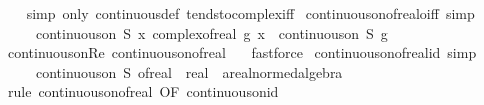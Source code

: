 \begin{isabellebody}
%
\isadelimproof
\ \ %
\endisadelimproof
%
\isatagproof
{}\isamarkupfalse%
\ {\isacharparenleft}{\kern0pt}simp\ only{\isacharcolon}{\kern0pt}\ continuous{\isacharunderscore}{\kern0pt}def\ tendsto{\isacharunderscore}{\kern0pt}complex{\isacharunderscore}{\kern0pt}iff{\isacharparenright}{\kern0pt}%
\endisatagproof
{\isafoldproof}%
%
\isadelimproof
\isanewline
%
\endisadelimproof
\isanewline
{}\isamarkupfalse%
\ continuous{\isacharunderscore}{\kern0pt}on{\isacharunderscore}{\kern0pt}of{\isacharunderscore}{\kern0pt}real{\isacharunderscore}{\kern0pt}o{\isacharunderscore}{\kern0pt}iff\ {\isacharbrackleft}{\kern0pt}simp{\isacharbrackright}{\kern0pt}{\isacharcolon}{\kern0pt}\isanewline
\ \ \ \ \ {\isachardoublequoteopen}continuous{\isacharunderscore}{\kern0pt}on\ S\ {\isacharparenleft}{\kern0pt}{\isasymlambda}x{\isachardot}{\kern0pt}\ complex{\isacharunderscore}{\kern0pt}of{\isacharunderscore}{\kern0pt}real\ {\isacharparenleft}{\kern0pt}g\ x{\isacharparenright}{\kern0pt}{\isacharparenright}{\kern0pt}\ {\isacharequal}{\kern0pt}\ continuous{\isacharunderscore}{\kern0pt}on\ S\ g{\isachardoublequoteclose}\isanewline
%
\isadelimproof
\ \ %
\endisadelimproof
%
\isatagproof
{}\isamarkupfalse%
\ continuous{\isacharunderscore}{\kern0pt}on{\isacharunderscore}{\kern0pt}Re\ continuous{\isacharunderscore}{\kern0pt}on{\isacharunderscore}{\kern0pt}of{\isacharunderscore}{\kern0pt}real\ \ \isamarkupfalse%
\ fastforce%
\endisatagproof
{\isafoldproof}%
%
\isadelimproof
\isanewline
%
\endisadelimproof
\isanewline
{}\isamarkupfalse%
\ continuous{\isacharunderscore}{\kern0pt}on{\isacharunderscore}{\kern0pt}of{\isacharunderscore}{\kern0pt}real{\isacharunderscore}{\kern0pt}id\ {\isacharbrackleft}{\kern0pt}simp{\isacharbrackright}{\kern0pt}{\isacharcolon}{\kern0pt}\isanewline
\ \ \ \ \ {\isachardoublequoteopen}continuous{\isacharunderscore}{\kern0pt}on\ S\ {\isacharparenleft}{\kern0pt}of{\isacharunderscore}{\kern0pt}real\ {\isacharcolon}{\kern0pt}{\isacharcolon}{\kern0pt}\ real\ {\isasymRightarrow}\ {\isacharprime}{\kern0pt}a{\isacharcolon}{\kern0pt}{\isacharcolon}{\kern0pt}real{\isacharunderscore}{\kern0pt}normed{\isacharunderscore}{\kern0pt}algebra{\isacharunderscore}{\kern0pt}{}{\isacharparenright}{\kern0pt}{\isachardoublequoteclose}\isanewline
%
\isadelimproof
\ \ %
\endisadelimproof
%
\isatagproof
{}\isamarkupfalse%
\ {\isacharparenleft}{\kern0pt}rule\ continuous{\isacharunderscore}{\kern0pt}on{\isacharunderscore}{\kern0pt}of{\isacharunderscore}{\kern0pt}real\ {\isacharbrackleft}{\kern0pt}OF\ continuous{\isacharunderscore}{\kern0pt}on{\isacharunderscore}{\kern0pt}id{\isacharbrackright}{\kern0pt}{\isacharparenright}{\kern0pt}%

\end{isabellebody}
